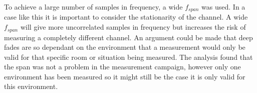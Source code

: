 To achieve a large number of samples in frequency, a wide $f_{span}$ was used. In a case like this it is important to consider the stationarity of the channel. A wide $f_{span}$ will give more uncorrelated samples in frequency but increases the risk of measuring a completely different channel. An argument could be made that deep fades are so dependant on the environment that a measurement would only be valid for that specific room or situation being measured. The analysis found that the span was not a problem in the measurement campaign, however only one environment has been measured so it might still be the case it is only valid for this environment.

